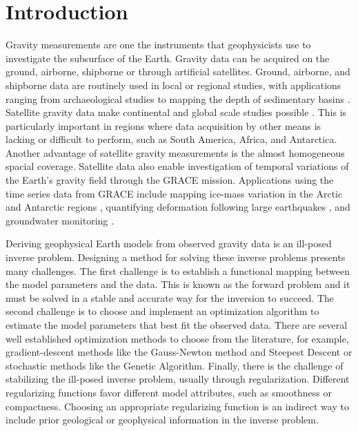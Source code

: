 \chapter{Introduction}


Gravity measurements are one the instruments that geophysicists use to
investigate the subsurface of the Earth.
Gravity data can be acquired on the ground, airborne, shipborne or through
artificial satellites.
Ground, airborne, and shipborne data are routinely used in local or regional
studies, with applications ranging from archaeological studies
\citep[e.g., ][]{panisova2013} to mapping the depth of
sedimentary basins \citep[e.g., ][]{gordon2013}.
Satellite gravity data make continental and global scale studies possible
\citep[e.g., ][]{vandermeijde2013, vandermeijde2015, bouman2013,
braitenberg2015, reguzzoni2013}.
This is particularly important in regions where data acquisition by other means
is lacking or difficult to perform, such as South America, Africa, and
Antarctica.
Another advantage of satellite gravity measurements is the almost homogeneous
spacial coverage.
Satellite data also enable investigation of temporal variations of the Earth's
gravity field through the GRACE mission.
Applications using the time series data from GRACE include mapping ice-mass
variation in the Arctic \citep{chen2011} and Antarctic regions
\citep{ramillien2006}, quantifying deformation following large earthquakes
\citep{mikhailov2014}, and groundwater monitoring \citep{humphrey2016}.

Deriving geophysical Earth models from observed gravity data is an ill-posed
inverse problem.
Designing a method for solving these inverse problems presents many challenges.
The first challenge is to establish a functional mapping between the model
parameters and the data.
This is known as the forward problem and it must be solved in a stable and
accurate way for the inversion to succeed.
The second challenge is to choose and implement an optimization algorithm to
estimate the model parameters that best fit the observed data.
There are several well established optimization methods to choose from the
literature, for example, gradient-descent methods like the Gauss-Newton method
and Steepest Descent or stochastic  methods like the Genetic Algorithm.
Finally, there is the challenge of stabilizing the ill-posed inverse problem,
usually through regularization.
Different regularizing functions favor different model attributes, such as
smoothness or compactness.
Choosing an appropriate regularizing function is an indirect way to include
prior geological or geophysical information in the inverse problem.

